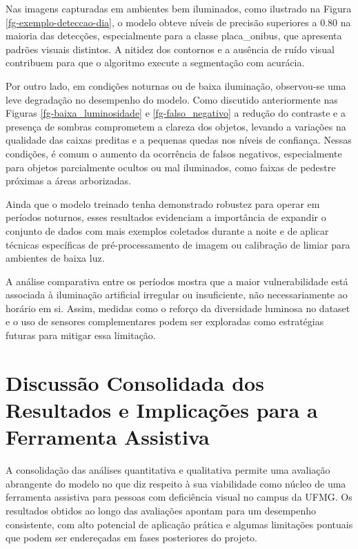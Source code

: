 Nas imagens capturadas em ambientes bem iluminados, como ilustrado na Figura \ref{fg-exemplo-deteccao-dia}, o modelo obteve níveis de precisão superiores a 0.80 na maioria das detecções, especialmente para a classe placa\_onibus, que apresenta padrões visuais distintos. A nitidez dos contornos e a ausência de ruído visual contribuem para que o algoritmo execute a segmentação com acurácia.

Por outro lado, em condições noturnas ou de baixa iluminação, observou-se uma leve degradação no desempenho do modelo. Como discutido anteriormente nas Figuras \ref{fg-baixa_luminosidade} e \ref{fg-falso_negativo} a redução do contraste e a presença de sombras comprometem a clareza dos objetos, levando a variações na qualidade das caixas preditas e a pequenas quedas nos níveis de confiança. Nessas condições, é comum o aumento da ocorrência de falsos negativos, especialmente para objetos parcialmente ocultos ou mal iluminados, como faixas de pedestre próximas a áreas arborizadas.

Ainda que o modelo treinado tenha demonstrado robustez para operar em períodos noturnos, esses resultados evidenciam a importância de expandir o conjunto de dados com mais exemplos coletados durante a noite e de aplicar técnicas específicas de pré-processamento de imagem ou calibração de limiar para ambientes de baixa luz.

A análise comparativa entre os períodos mostra que a maior vulnerabilidade está associada à iluminação artificial irregular ou insuficiente, não necessariamente ao horário em si. Assim, medidas como o reforço da diversidade luminosa no dataset e o uso de sensores complementares podem ser exploradas como estratégias futuras para mitigar essa limitação.

\section{\textbf{Discussão Consolidada dos Resultados e Implicações para a Ferramenta Assistiva}}

A consolidação das análises quantitativa e qualitativa permite uma avaliação abrangente do modelo no que diz respeito à sua viabilidade como núcleo de uma ferramenta assistiva para pessoas com deficiência visual no campus da UFMG. Os resultados obtidos ao longo das avaliações apontam para um desempenho consistente, com alto potencial de aplicação prática e algumas limitações pontuais que podem ser endereçadas em fases posteriores do projeto.

